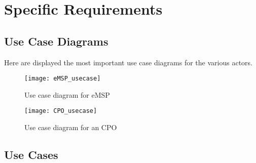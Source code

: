 \newcommand{\usecase}[5]{{
	\setlength\extrarowheight{5pt}
	\begin{tabular}{|p{3cm}|p{10cm}|}
		\hline
		Actor & #1\\
		\hline
		Entry conditions & #2\\
		\hline
		Event flow & #3\\
		\hline
		Exit condition & #4\\
		\hline
		Exceptions & #5\\
		\hline
	\end{tabular}
}}

\chapter{Specific Requirements}

\section{Use Case Diagrams}
Here are displayed the most important use case diagrams for the various actors.

\begin{figure}[h]
\centering
\texttt{[image: eMSP\_usecase]}
\caption{Use case diagram for eMSP}
\end{figure}


\begin{figure}[h]
\centering
\texttt{[image: CPO\_usecase]}
\caption{Use case diagram for an CPO}
\end{figure}



\clearpage


\section{Use Cases}

